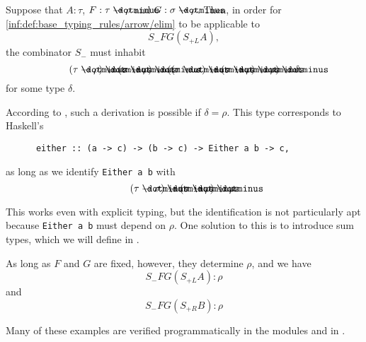 \begin{example}
\begin{thmenum}
    Suppose that \( A: \tau \), \( F: \tau \synimplies \rho \) and \( G: \sigma \synimplies \rho \). Then, in order for \ref{inf:def:base_typing_rules/arrow/elim} to be applicable to
    \begin{equation*}
      S_- F G (S_{+L} A),
    \end{equation*}
    the combinator \( S_- \) must inhabit
    \begin{equation*}
      (\tau \synimplies \rho) \synimplies (\sigma \synimplies \rho) \synimplies ((\tau \synimplies \sigma) \synimplies (\sigma \synimplies \rho) \synimplies \rho) \synimplies \delta
    \end{equation*}
    for some type \( \delta \).

    According to , such a derivation is possible if \( \delta = \rho \). This type corresponds to Haskell's
    \begin{verbatim}
      either :: (a -> c) -> (b -> c) -> Either a b -> c,
    \end{verbatim}\vspace{-\baselineskip}
    as long as we identify \verb|Either a b| with
    \begin{equation*}
      (\tau \synimplies \sigma) \synimplies (\sigma \synimplies \rho) \synimplies \rho.
    \end{equation*}

    This works even with explicit typing, but the identification is not particularly apt because \verb|Either a b| must depend on \( \rho \). One solution to this is to introduce sum types, which we will define in .

    As long as \( F \) and \( G \) are fixed, however, they determine \( \rho \), and we have
    \begin{equation*}
      S_- F G (S_{+L} A): \rho
    \end{equation*}
    and
    \begin{equation*}
      S_- F G (S_{+R} B): \rho
    \end{equation*}
  \end{thmenum}
\end{example}
\begin{comments}
  \item Many of these examples are verified programmatically in the modules  and  in \cite{notebook:code}.
\end{comments}

